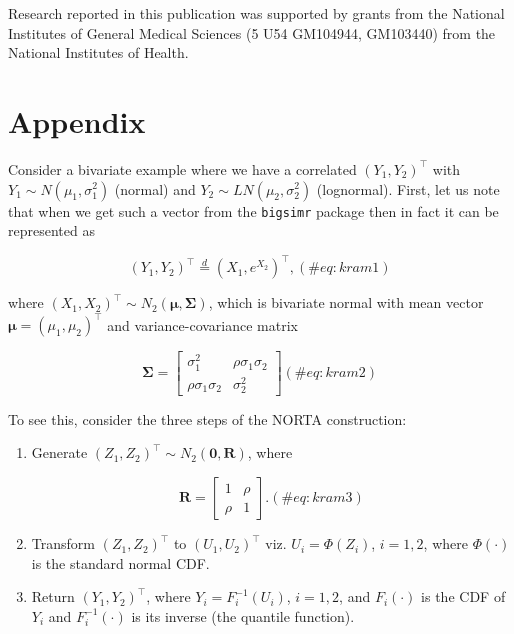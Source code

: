 \documentclass[
]{jss}
\begin{document}
Research reported in this publication was supported by grants from the
National Institutes of General Medical Sciences (5 U54 GM104944,
GM103440) from the National Institutes of Health.

\newpage

\hypertarget{appendix}{%
\section*{Appendix}\label{appendix}}

\noindent Consider a bivariate example where we have a correlated
\((Y_1, Y_2)^\top\) with \(Y_1\sim N(\mu_1, \sigma_1^2)\) (normal) and
\(Y_2\sim LN(\mu_2, \sigma_2^2)\) (lognormal). First, let us note that
when we get such a vector from the \texttt{bigsimr} package then in fact
it can be represented as

\begin{equation}
(Y_1, Y_2)^\top \stackrel{d}{=} \left(X_1, e^{X_2}\right)^\top,
(\#eq:kram1)
\end{equation}

where \((X_1, X_2)^\top \sim N_2(\boldsymbol \mu, \boldsymbol \Sigma)\),
which is bivariate normal with mean vector
\(\boldsymbol \mu = (\mu_1, \mu_2)^\top\) and variance-covariance matrix

\begin{equation}
\boldsymbol \Sigma = 
\begin{bmatrix}
\sigma_1^2 & \rho \sigma_1\sigma_2\\
\rho \sigma_1\sigma_2 & \sigma_2^2
\end{bmatrix}
(\#eq:kram2)
\end{equation}

To see this, consider the three steps of the NORTA construction:

\begin{enumerate}

\item Generate $(Z_1, Z_2)^\top \sim N_2(\boldsymbol 0, \boldsymbol R)$, where 

\begin{equation}
\boldsymbol R = 
\left[
\begin{array}{cc}
1 & \rho \\
\rho & 1
\end{array}
\right].
(\#eq:kram3)
\end{equation}


\item Transform $(Z_1, Z_2)^\top$ to $(U_1, U_2)^\top$ viz. $U_i =\Phi(Z_i)$,  $i=1,2$, where $\Phi(\cdot)$ is the standard normal CDF. 

\item Return $(Y_1, Y_2)^\top$, where $Y_i=F_i^{-1}(U_i)$, $i=1,2$, and $F_i(\cdot)$ is the CDF of $Y_i$ and $F_i^{-1}(\cdot)$ is its inverse (the quantile function). 

\end{enumerate}
\end{document}

